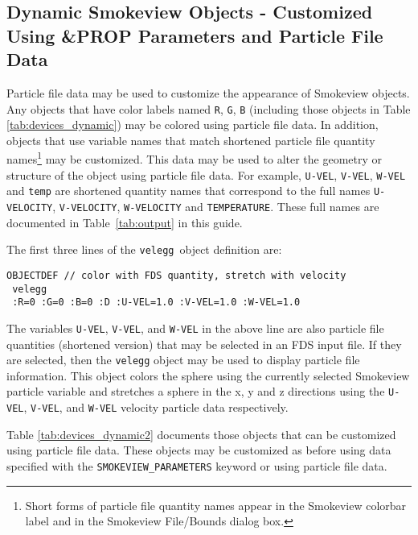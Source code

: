\subsection{Dynamic Smokeview Objects - Customized Using \&PROP Parameters and Particle File Data}
Particle file data may be used to customize the appearance of Smokeview objects.  Any objects that have color 
labels named {\tt R}, {\tt G}, {\tt B} (including those objects in Table \ref{tab:devices_dynamic}) may be 
colored using particle file data.  In addition, objects that use variable names that match shortened 
particle file quantity names\footnote{Short forms of particle file quantity names appear in the Smokeview colorbar label 
and in the Smokeview File/Bounds dialog box.}
may be customized.  This data may be used to alter the geometry or structure of the object 
using particle file data.  For example, {\tt U-VEL}, {\tt V-VEL}, {\tt W-VEL} and {\tt temp} are shortened 
quantity names that correspond to the full names {\tt U-VELOCITY}, {\tt V-VELOCITY}, {\tt W-VELOCITY} and 
{\tt TEMPERATURE}.  These full names are documented in Table~\ref{tab:output} in this guide.

The first three lines of the {\tt velegg}\ object definition are:
\begin{verbatim}
OBJECTDEF // color with FDS quantity, stretch with velocity
 velegg
 :R=0 :G=0 :B=0 :D :U-VEL=1.0 :V-VEL=1.0 :W-VEL=1.0
 \end{verbatim}
The variables {\tt U-VEL}, {\tt V-VEL}, and {\tt W-VEL} in the above line are also particle file quantities (shortened version) that may be
selected in an FDS input file.  If they are selected, then the {\tt velegg} object may be used to display
particle file information. This  object colors the sphere using the currently selected Smokeview particle
variable and stretches a sphere in the x, y and z directions using the {\tt U-VEL}, {\tt V-VEL}, and {\tt W-VEL}
velocity particle data respectively.  

Table \ref{tab:devices_dynamic2} documents those objects that can be customized
using particle file data.  These objects may be customized as before using data specified with the {\tt SMOKEVIEW\_PARAMETERS}
keyword or using particle file data.

